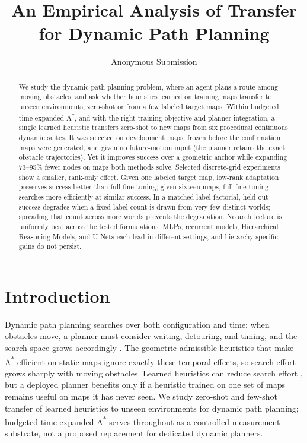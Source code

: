 \documentclass[letterpaper]{article} %
\title{An Empirical Analysis of Transfer for Dynamic Path Planning}
\author{
    Anonymous Submission
}
\begin{document}
\maketitle

\begin{abstract}
We study the dynamic path planning problem, where an agent plans a route among moving obstacles, and ask whether heuristics learned on training maps transfer to unseen environments, zero-shot or from a few labeled target maps. Within budgeted time-expanded A\textsuperscript{*}, and with the right training objective and planner integration, a single learned heuristic transfers zero-shot to new maps from six procedural continuous dynamic suites. It was selected on development maps, frozen before the confirmation maps were generated, and given no future-motion input (the planner retains the exact obstacle trajectories). Yet it improves success over a geometric anchor while expanding 73--95\% fewer nodes on maps both methods solve. Selected discrete-grid experiments show a smaller, rank-only effect. Given one labeled target map, low-rank adaptation preserves success better than full fine-tuning; given sixteen maps, full fine-tuning searches more efficiently at similar success. In a matched-label factorial, held-out success degrades when a fixed label count is drawn from very few distinct worlds; spreading that count across more worlds prevents the degradation. No architecture is uniformly best across the tested formulations: MLPs, recurrent models, Hierarchical Reasoning Models, and U-Nets each lead in different settings, and hierarchy-specific gains do not persist.
\end{abstract}

\section{Introduction}

Dynamic path planning searches over both configuration and time: when obstacles move, a planner must consider waiting, detouring, and timing, and the search space grows accordingly \citep{silver2005cooperative,phillips2011sipp}. The geometric admissible heuristics that make A\textsuperscript{*} \citep{hart1968astar} efficient on static maps ignore exactly these temporal effects, so search effort grows sharply with moving obstacles. Learned heuristics can reduce search effort \citep{arfaee2011bootstrap,bhardwaj2017sail,yonetani2021neuralastar}, but a deployed planner benefits only if a heuristic trained on one set of maps remains useful on maps it has never seen. We study zero-shot and few-shot transfer of learned heuristics to unseen environments for dynamic path planning; budgeted time-expanded A\textsuperscript{*} serves throughout as a controlled measurement substrate, not a proposed replacement for dedicated dynamic planners.
\end{document}
